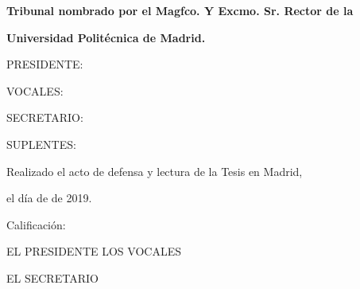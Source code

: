 \textbf{Tribunal nombrado por el Magfco. Y Excmo. Sr. Rector de la}

\textbf{Universidad Polit\'{e}cnica de Madrid.}

\vspace*{1cm}

PRESIDENTE:

\vspace*{1.5cm}

VOCALES:

%
%
\vspace*{3cm}

SECRETARIO:

\vspace*{1.5cm}

SUPLENTES:

\vspace*{3.5cm}

\hfill{Realizado el acto de defensa y lectura de la Tesis en Madrid,}

\hfill{el día \underline{\hspace{1cm}} de \underline{\hspace{2.5cm}} de 2019.}

\vspace*{1cm}

Calificaci\'{o}n:

\vspace*{2cm}

EL PRESIDENTE \quad\quad\quad\quad\quad\quad\quad\quad\quad\quad LOS VOCALES

\vspace*{2cm}

EL SECRETARIO